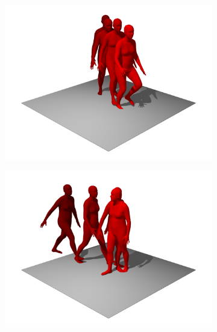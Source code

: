\begin{figure}[H]
    \centering
    \begin{subfigure}{0.32\linewidth}
        \includegraphics[width=\linewidth]{figures/results/single-falls1.png}
    \end{subfigure}
    \hfill
    \begin{subfigure}{0.32\linewidth}
        \includegraphics[width=\linewidth]{figures/results/single-falls2.png}
    \end{subfigure}
    \hfill
    \begin{subfigure}{0.32\linewidth}

\end{subfigure}
\end{figure}
